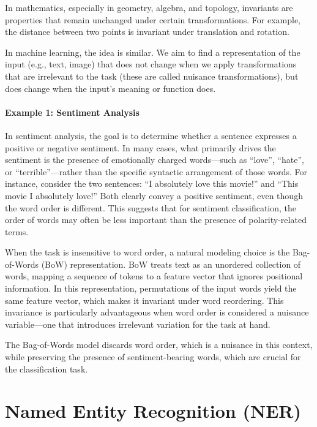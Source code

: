 In mathematics, especially in geometry, algebra, and topology, invariants are properties that remain unchanged under certain transformations. For example, the distance between two points is invariant under translation and rotation.

In machine learning, the idea is similar. We aim to find a representation of the input (e.g., text, image) that does not change when we apply transformations that are irrelevant to the task (these are called nuisance transformations), but does change when the input's meaning or function does.

\paragraph{Example 1: Sentiment Analysis}

In sentiment analysis, the goal is to determine whether a sentence expresses a positive or negative sentiment. In many cases, what primarily drives the sentiment is the presence of emotionally charged words—such as ``love'', ``hate'', or ``terrible''—rather than the specific syntactic arrangement of those words. For instance, consider the two sentences: ``I absolutely love this movie!'' and ``This movie I absolutely love!'' Both clearly convey a positive sentiment, even though the word order is different. This suggests that for sentiment classification, the order of words may often be less important than the presence of polarity-related terms.

When the task is insensitive to word order, a natural modeling choice is the Bag-of-Words (BoW) representation. BoW treats text as an unordered collection of words, mapping a sequence of tokens to a feature vector that ignores positional information. In this representation, permutations of the input words yield the same feature vector, which makes it invariant under word reordering. This invariance is particularly advantageous when word order is considered a nuisance variable—one that introduces irrelevant variation for the task at hand.

\begin{tcolorbox}[colback=gray!10, colframe=black, title=Takeaway]
	The Bag-of-Words model discards word order, which is a nuisance in this context, while preserving the presence of sentiment-bearing words, which are crucial for the classification task.
\end{tcolorbox}

\section{Named Entity Recognition (NER)}

